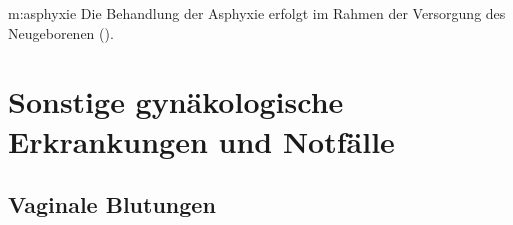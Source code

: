 {m:asphyxie}
{%
Die Behandlung der Asphyxie erfolgt im Rahmen der Versorgung
des Neugeborenen ().
}{}

\section{Sonstige gynäkologische Erkrankungen und
Notfälle}

\subsection{Vaginale Blutungen}
\label{topic:unterleibsblutungen}

